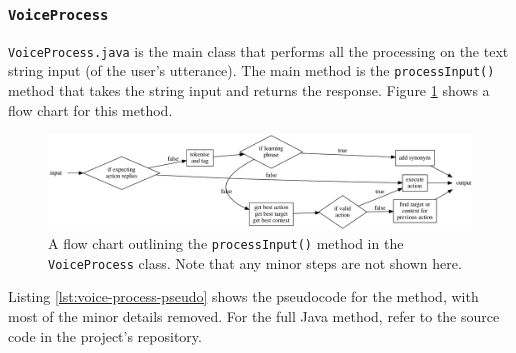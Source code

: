 \documentclass[11pt]{article}
\begin{document}
\subsubsection{\texttt{VoiceProcess}}

\texttt{VoiceProcess.java} is the main class that performs all the processing on the text string input (of the user's utterance). The main method is the \texttt{processInput()} method that takes the string input and returns the response. Figure \ref{fig:process-input} shows a flow chart for this method.

\begin{figure}[H]
\begin{center}
  \includegraphics[width=\linewidth]{process-input.pdf}
  \caption{A flow chart outlining the \texttt{processInput()} method in the \texttt{VoiceProcess} class. Note that any minor steps are not shown here.}
  \label{fig:process-input}
  \end{center}
\end{figure}

Listing \ref{lst:voice-process-pseudo} shows the pseudocode for the method, with most of the minor details removed. For the full Java method, refer to the source code in the project's repository.
\end{document}
